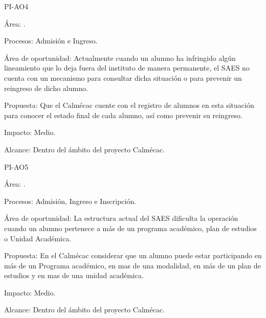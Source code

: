 \begin{AreaOportunidad}{PI-AO4}
	\item[Área:] .
	\item[Procesos:] Admisión e Ingreso.
	\item[Área de oportunidad:] Actualmente cuando un alumno ha infringido algún lineamiento que lo deja fuera del instituto de manera permanente, el SAES no cuenta con un mecanismo para consultar dicha situación o para prevenir un reingreso de dicho alumno.
	\item[Propuesta:] Que el Calmécac cuente con el registro de alumnos en esta situación para conocer el estado final de cada alumno, así como prevenir su reingreso.
	\item[Impacto:] Medio.
	\item[Alcance:] Dentro del ámbito del proyecto Calmécac.
\end{AreaOportunidad}


\begin{AreaOportunidad}{PI-AO5}
	\item[Área:] .
	\item[Procesos:] Admisión, Ingreso e Inscripción.
	\item[Área de oportunidad:] La estructura actual del SAES dificulta la operación cuando un alumno pertenece a más de un programa académico, plan de estudios o Unidad Académica. 
	\item[Propuesta:] En el Calmécac considerar que un alumno puede estar participando en más de un Programa académico, en mas de una modalidad, en más de un plan de estudios y en mas de una unidad académica.
	\item[Impacto:] Medio.
	\item[Alcance:] Dentro del ámbito del proyecto Calmécac.
\end{AreaOportunidad}


